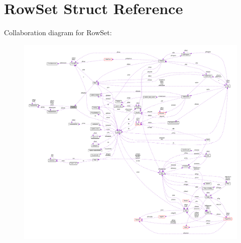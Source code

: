 \hypertarget{struct_row_set}{\section{Row\-Set Struct Reference}
\label{struct_row_set}
}


Collaboration diagram for Row\-Set\-:\nopagebreak
\begin{figure}[H]
\begin{center}
\leavevmode
\includegraphics[width=350pt]{struct_row_set__coll__graph}
\end{center}
\end{figure}
